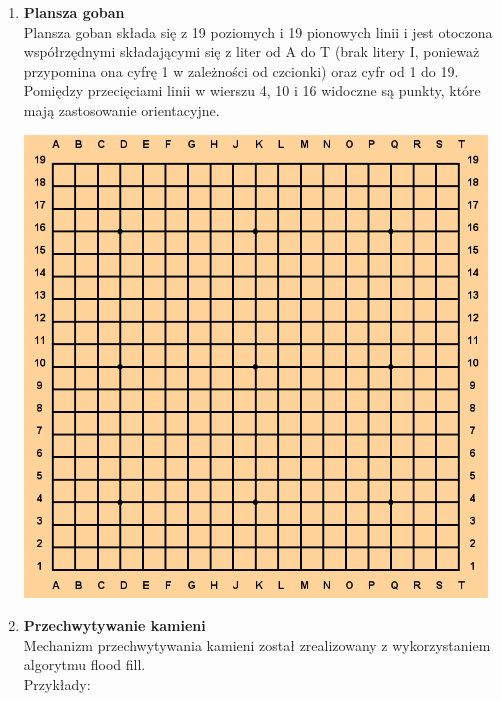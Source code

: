 \documentclass{article}
\begin{document}
\begin{enumerate}
    \item \textbf{Plansza goban}\\
          Plansza goban składa się z 19 poziomych i 19 pionowych linii i jest
          otoczona współrzędnymi składającymi się z liter od A do T
          (brak litery I, ponieważ przypomina ona cyfrę 1 w zależności od
          czcionki) oraz cyfr od 1 do 19. Pomiędzy przecięciami linii
          w wierszu 4, 10 i 16 widoczne są punkty, które mają zastosowanie
          orientacyjne.

          \begin{center}
              \includegraphics[height=12.25cm]{imgs/goban.png}
          \end{center}
    \item  \textbf{Przechwytywanie kamieni}\\
          Mechanizm przechwytywania kamieni został zrealizowany z wykorzystaniem
          algorytmu flood fill.\\
          Przykłady:\\


\end{enumerate}
\end{document}
